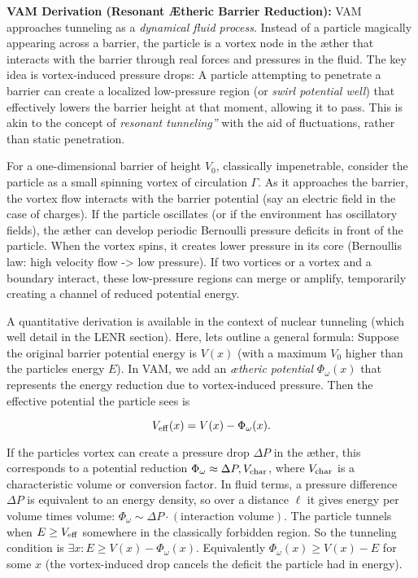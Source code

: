 \documentclass[a4paper, aps,preprint,superscriptaddress, 12pt]{revtex4}
\begin{document}
\textbf{VAM Derivation (Resonant Ætheric Barrier Reduction):} VAM approaches tunneling as a \textit{dynamical fluid process}. Instead of a particle magically appearing across a barrier, the particle is a vortex node in the æther that interacts with the barrier through real forces and pressures in the fluid. The key idea is vortex-induced pressure drops: A particle attempting to penetrate a barrier can create a localized low-pressure region (or \textit{swirl potential well}) that effectively lowers the barrier height at that moment, allowing it to pass. This is akin to the concept of \textit{\grqq resonant tunneling\textquotedblright} with the aid of fluctuations, rather than static penetration.


For a one-dimensional barrier of height $V_0$, classically impenetrable, consider the particle as a small spinning vortex of circulation $\Gamma$. As it approaches the barrier, the vortex flow interacts with the barrier potential (say an electric field in the case of charges). If the particle oscillates (or if the environment has oscillatory fields), the æther can develop periodic Bernoulli pressure deficits in front of the particle. When the vortex spins, it creates lower pressure in its core (Bernoulli\rqs s law: high velocity flow -> low pressure). If two vortices or a vortex and a boundary interact, these low-pressure regions can merge or amplify, temporarily creating a channel of reduced potential energy.


A quantitative derivation is available in the context of nuclear tunneling (which we\rqs ll detail in the LENR section). Here, let\rqs s outline a general formula: Suppose the original barrier potential energy is $V(x)$ (with a maximum $V_0$ higher than the particle\rqs s energy $E$). In VAM, we add an \textit{ætheric potential} $\Phi_\omega(x)$ that represents the energy reduction due to vortex-induced pressure. Then the effective potential the particle sees is

\begin{equation}
    V_{\rm eff}(x) = V(x) - \Phi_\omega(x).
\end{equation}

If the particle\rqs s vortex can create a pressure drop $\Delta P$ in the æther, this corresponds to a potential reduction $\Phi_\omega \approx \Delta P , V_{\rm char}$, where $V_{\rm char}$ is a characteristic volume or conversion factor. In fluid terms, a pressure difference $\Delta P$ is equivalent to an energy density, so over a distance $\ell$ it gives energy per volume times volume: $ \Phi_\omega \sim \Delta P \cdot (\text{interaction volume})$. The particle tunnels when $E \ge V_{\rm eff}$ somewhere in the classically forbidden region. So the tunneling condition is $\exists x: E \ge V(x) - \Phi_\omega(x)$. Equivalently $\Phi_\omega(x) \ge V(x) - E$ for some $x$ (the vortex-induced drop cancels the deficit the particle had in energy).
\end{document}
